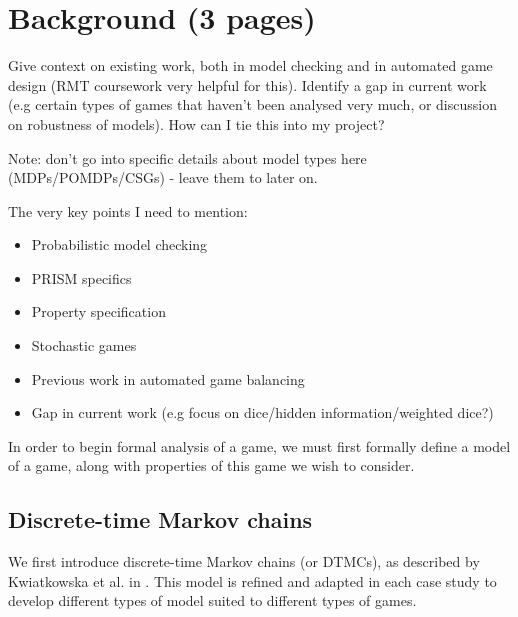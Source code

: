 
\chapter{Background (3 pages)}

Give context on existing work, both in model checking and in automated game design (RMT coursework very helpful for this). Identify a gap in current work (e.g certain types of games that haven't been analysed very much, or discussion on robustness of models). How can I tie this into my project?

Note: don't go into specific details about model types here (MDPs/POMDPs/CSGs) - leave them to later on.

The very key points I need to mention:

\begin{itemize}
    \item Probabilistic model checking
    \item PRISM specifics
    \item Property specification
    \item Stochastic games
    \item Previous work in automated game balancing
    \item Gap in current work (e.g focus on dice/hidden information/weighted dice?)
\end{itemize}

In order to begin formal analysis of a game, we must first formally define a model of a game, along with properties of this game we wish to consider.

\section{Discrete-time Markov chains}
\label{back:stoc_game}

We first introduce discrete-time Markov chains (or DTMCs), as described by Kwiatkowska et al. in \cite{kwiatkowska_stochastic_2007}. This model is refined and adapted in each case study to develop different types of model suited to different types of games.

